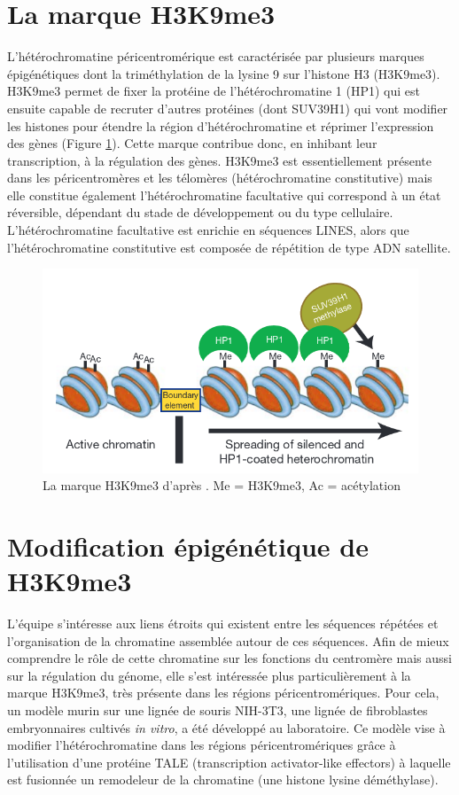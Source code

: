 \documentclass[a4paper,12pt,times]{report}
\newcommand{\scaption}[1]{\caption{\footnotesize{#1}}}
\begin{document}
\section{La marque H3K9me3}

L'hétérochromatine péricentromérique est caractérisée par plusieurs marques épigénétiques dont la triméthylation de la lysine 9 sur l'histone H3 (H3K9me3). H3K9me3 permet de fixer la protéine de l'hétérochromatine 1 (HP1) qui est ensuite capable de recruter d'autres protéines (dont SUV39H1) qui vont modifier les histones pour  étendre la région d'hétérochromatine et réprimer l'expression des gènes (Figure \ref{H3K9me3}). Cette marque contribue donc, en inhibant leur transcription, à la régulation des gènes. 
\newline H3K9me3 est essentiellement présente dans les péricentromères et les télomères (hétérochromatine constitutive) mais elle constitue également l'hétérochromatine facultative qui correspond à un état réversible, dépendant du stade de développement ou du type cellulaire. L'hétérochromatine facultative est enrichie en séquences LINES, alors que l'hétérochromatine constitutive est composée de répétition de type ADN satellite.


\begin{figure}[!h]
\centering
\includegraphics[scale=0.6]{H3K9me3.png}
\scaption{La marque H3K9me3 d'après \cite{intro} . Me = H3K9me3, Ac = acétylation}
\label{H3K9me3}
\end{figure}
\section{Modification épigénétique de H3K9me3}
L'équipe s'intéresse aux liens étroits qui existent entre les séquences répétées et l'organisation de la chromatine assemblée autour de ces séquences. Afin de mieux comprendre le rôle de cette chromatine sur les fonctions du centromère mais aussi sur la régulation du génome, elle s'est intéressée plus particulièrement à la marque H3K9me3, très présente dans les régions péricentromériques.
\newline Pour cela,  un modèle murin sur une lignée de souris NIH-3T3, une lignée de fibroblastes embryonnaires cultivés \textit{in vitro}, a été développé au laboratoire. 
Ce modèle vise à modifier l'hétérochromatine dans les régions péricentromériques grâce à l'utilisation d'une protéine TALE (transcription activator-like effectors) à laquelle est fusionnée un remodeleur de la chromatine (une histone lysine déméthylase). 
\end{document}
